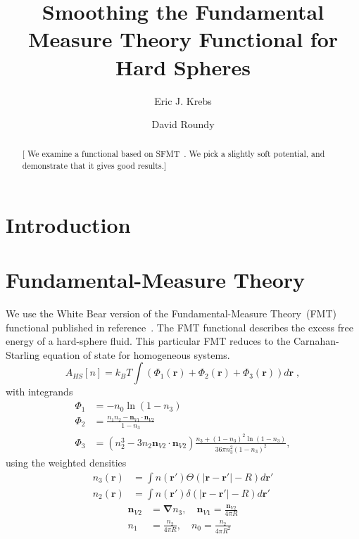 \documentclass[letterpaper,twocolumn,amsmath,amssymb,prb]{revtex4-1}
\newcommand{\red}[1]{{\color{red} #1}}
\newcommand{\rr}{\textbf{r}}
\newcommand{\fixme}[1]{\red{[#1]}}
\begin{document}
\title{Smoothing the Fundamental Measure Theory Functional for Hard Spheres}

\author{Eric J. Krebs}

\author{David Roundy}

\begin{abstract}
\fixme{ We examine a functional based on SFMT~\cite{schmidt2000fluid}.
  We pick a slightly soft potential, and demonstrate that it gives
  good results.}
\end{abstract}

\maketitle

\section{Introduction}



\section{Fundamental-Measure Theory}

We use the White Bear version of the Fundamental-Measure Theory~(FMT)
functional published in reference~\cite{roth2002whitebear}.  The FMT
functional describes the excess free energy of a hard-sphere fluid.
This particular FMT reduces to the Carnahan-Starling equation of state
for homogeneous systems.
\begin{equation}
A_\textit{HS}[n] = k_B T \int \left(\Phi_1(\rr) + \Phi_2(\rr) + \Phi_3(\rr)\right) d\rr \; ,
\end{equation}
with integrands
\begin{align}
\Phi_1 &= -n_0 \ln\left( 1 - n_3\right)\\
\Phi_2 &= \frac{n_1 n_2 - \mathbf{n}_{V1} \cdot\mathbf{n}_{V2}}{1-n_3} \\
\Phi_3 &= (n_2^3 - 3 n_2 \mathbf{n}_{V2} \cdot \mathbf{n}_{V2}) \frac{
  n_3 + (1-n_3)^2 \ln(1-n_3)
}{
  36\pi n_3^2\left( 1 - n_3 \right)^2
} ,
\end{align}
using the weighted densities
\begin{align}
  n_3(\rr) &= \int n(\rr') \Theta(\left|\rr - \rr'\right| - R) d\rr' \\
  n_2(\rr) &= \int n(\rr') \delta(\left|\rr - \rr'\right| - R) d\rr'
\end{align}
\begin{align}
  \mathbf{n}_{V2} &= \mathbf{\nabla} n_3 , \quad
  \mathbf{n}_{V1} = \frac{\mathbf{n}_{V2}}{4\pi R} \\
  n_1 &= \frac{n_2}{4\pi R} , \quad
  n_0 = \frac{n_2}{4\pi R^2}
\end{align}
\end{document}
